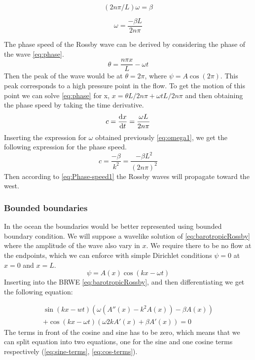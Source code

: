 \begin{equation}
    (2n\pi / L) \omega = \beta
\end{equation}

\begin{equation}\label{eq:omega1}
    \omega = \frac{-\beta L}{2n\pi}
\end{equation}

The phase speed of the Rossby wave can be derived by considering the phase of
the wave \cref{eq:phase}.
\begin{equation}\label{eq:phase}
    \theta = \frac{n \pi x}{L} - \omega t
\end{equation}
Then the peak of the wave would be at $\theta = 2\pi$, where $\psi = A\cos{(2\pi)}$.
This peak corresponds to a high pressure point in the flow. To get the motion of this point we can solve
\cref{eq:phase} for x, $x=\theta L / 2n \pi + \omega t L / 2n \pi$ and then
obtaining the phase speed by taking the time derivative.
\begin{equation}
    c = \dv{x}{t} = \frac{\omega L}{2n\pi}
\end{equation}
Inserting the expression for $\omega$ obtained previously \cref{eq:omega1}, we
get the following expression for the phase speed.
\begin{equation}\label{eq:Phase-speed1}
    c = \frac{-\beta}{k^2} = \frac{-\beta L^2}{(2n\pi)^2}
\end{equation}
Then according to \cref{eq:Phase-speed1} the Rossby waves will propagate
toward the west.
\subsubsection{Bounded boundaries}
In the ocean the boundaries would be better represented using bounded boundary
condition. We will suppose a wavelike solution of \cref{eq:barotropicRossby}
where the amplitude of the wave also vary in $x$. We
require there to be no flow at the endpoints, which we can enforce with simple
Dirichlet conditions $\psi= 0$ at $x=0$ and $x=L$.
\begin{equation}\label{eq:waveSolution2}
    \psi = A(x)\cos{(kx-\omega t)}
\end{equation}
Inserting \label{eq:waveSolution2} into the BRWE
\cref{eq:barotropicRossby}, and then differentiating we get the following
equation:

\begin{equation}\label{eq:step1}
    \begin{split}
    \sin{(kx-wt)\left(\omega(A''(x)-k^2A(x))- \beta A(x)\right)} \\
    + \cos{(kx - \omega t)}\left(\omega 2kA'(x) +\beta A'(x)\right) = 0
    \end{split}
\end{equation}
The terms in front of the cosine and sine has to be zero, which means that we
can split equation into two equations, one for the sine and one cosine
terms respectively (\cref{eq:sine-terms}, \cref{eq:cos-terms}).

